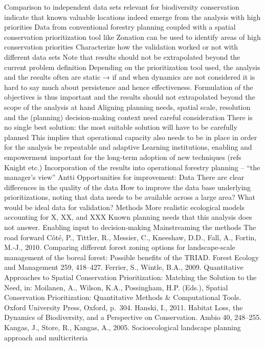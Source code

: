 \documentclass[]{article}
\begin{document}
Comparison to independent data sets relevant for biodiversity
conservation indicate that known valuable locations indeed emerge from
the analysis with high priorities Data from conventional forestry
planning coupled with a spatial conservation prioritization tool like
Zonation can be used to identify areas of high conservation priorities
Characterize how the validation worked or not with different data sets
Note that results should not be extrapolated beyond the current problem
definition Depending on the prioritization tool used, the analysis and
the results often are static → if and when dynamics are not considered
it is hard to say much about persistence and hence effectiveness.
Formulation of the objectives is thus important and the results should
not extrapolated beyond the scope of the analysis at hand Aligning
planning needs, spatial scale, resolution and the (planning)
decision-making context need careful consideration There is no single
best solution: the most suitable solution will have to be carefully
planned This implies that operational capacity also needs to be in place
in order for the analysis be repeatable and adaptive Learning
institutions, enabling and empowerment important for the long-term
adoption of new techniques (refs Knight etc.) Incorporation of the
results into operational forestry planning -- ``the manager's view''
Antti Opportunities for improvement: Data There are clear differences in
the quality of the data How to improve the data base underlying
prioritizations, noting that data needs to be available across a large
area? What would be ideal data for validation? Methods More realistic
ecological models accounting for X, XX, and XXX Known planning needs
that this analysis does not answer. Enabling input to decision-making
Mainstreaming the methods The road forward Côté, P., Tittler, R.,
Messier, C., Kneeshaw, D.D., Fall, A., Fortin, M.-J., 2010. Comparing
different forest zoning options for landscape-scale management of the
boreal forest: Possible benefits of the TRIAD. Forest Ecology and
Management 259, 418--427. Ferrier, S., Wintle, B.A., 2009. Quantitative
Approaches to Spatial Conservation Prioritization: Matching the Solution
to the Need, in: Moilanen, A., Wilson, K.A., Possingham, H.P. (Eds.),
Spatial Conservation Prioritization: Quantitative Methods \&
Computational Tools. Oxford University Press, Oxford, p.~304. Hanski,
I., 2011. Habitat Loss, the Dynamics of Biodiversity, and a Perspective
on Conservation. Ambio 40, 248--255. Kangas, J., Store, R., Kangas, A.,
2005. Socioecological landscape planning approach and multicriteria
\end{document}
